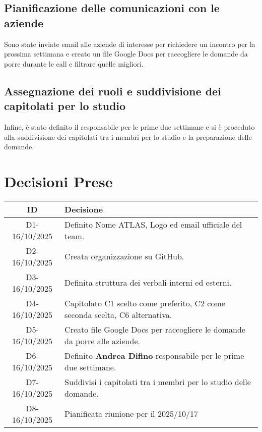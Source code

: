 \documentclass[a4paper,12pt]{article}
\begin{document}
{    \subsection{Pianificazione delle comunicazioni con le aziende}{
        Sono state inviate email alle aziende di interesse per richiedere un incontro per la prossima settimana e creato un file Google Docs per raccogliere le domande da porre durante le call e filtrare quelle migliori.  
        
    }

    \subsection{Assegnazione dei ruoli e suddivisione dei capitolati per lo studio}{
        Infine, è stato definito il responsabile per le prime due settimane e si è proceduto alla suddivisione dei capitolati tra i membri per lo studio e la preparazione delle domande.
    }

}


\section{Decisioni Prese}{
    \begin{center}
    \begin{tabular}{|c|p{11cm}|}
        \hline
        \textbf{ID} & \textbf{Decisione} \\
        \hline
        D1-16/10/2025 & Definito Nome ATLAS, Logo ed email ufficiale del team. \\
        \hline
        D2-16/10/2025 & Creata organizzazione su GitHub. \\
        \hline
        D3-16/10/2025 & Definita struttura dei verbali interni ed esterni. \\
        \hline
        D4-16/10/2025 & Capitolato C1 scelto come preferito, C2 come seconda scelta, C6 alternativa. \\
        \hline
        D5-16/10/2025 & Creato file Google Docs per raccogliere le domande da porre alle aziende. \\
        \hline
        D6-16/10/2025 & Definito \textbf{Andrea Difino} responsabile per le prime due settimane. \\
        \hline
        D7-16/10/2025 & Suddivisi i capitolati tra i membri per lo studio delle domande. \\
        \hline
        D8-16/10/2025 & Pianificata riunione per il 2025/10/17 \\
        \hline
    \end{tabular}
    \end{center}
}
\end{document}

